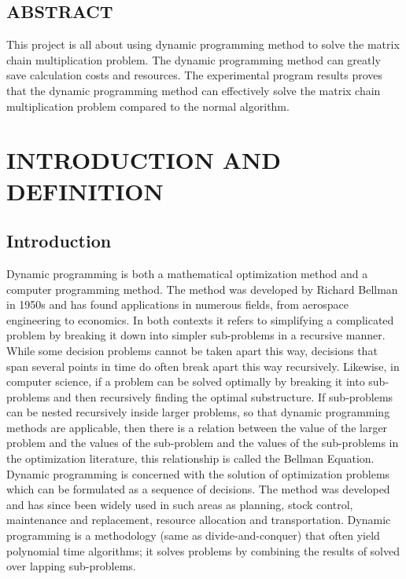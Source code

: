 \documentclass[12pt]{report}
\begin{document}
	\pagebreak
	\begin{center}
		\section*{ABSTRACT}
	\end{center}
	This project is all about using dynamic programming method to solve the matrix chain multiplication problem. The dynamic programming method can greatly save calculation costs and resources. The experimental program results proves that the dynamic programming method can effectively solve the matrix chain multiplication problem compared to the normal algorithm. 
	
	
	\newpage
	\tableofcontents
	
	\newpage
	\newpage
	\chapter{INTRODUCTION AND DEFINITION}
	\section{Introduction}
	Dynamic programming is both a mathematical optimization method and a computer programming method. The method was developed by Richard Bellman in 1950s and has found applications in numerous fields, from aerospace engineering to economics. In both contexts it refers to simplifying a complicated problem by breaking it down into simpler sub-problems in a recursive manner. While some decision problems cannot be taken apart this way, decisions that span several points in time do often break apart this way recursively. Likewise, in computer science, if a problem can be solved optimally by breaking it into sub-problems and then recursively finding the optimal substructure. If sub-problems can be nested recursively inside larger problems, so that dynamic programming methods are applicable, then there is a relation between the value of the larger problem and the values of the sub-problem and the values of the sub-problems in the optimization literature, this relationship is called the Bellman Equation. \\
	
	Dynamic programming is concerned with the solution of optimization problems which can be formulated as a sequence of decisions. The method was developed and has since been widely used in such areas as planning, stock control, maintenance and replacement, resource allocation and transportation. Dynamic programming is a methodology (same as divide-and-conquer) that often yield polynomial time algorithms; it solves problems by combining the results of solved over lapping sub-problems. \\
	
\end{document}

